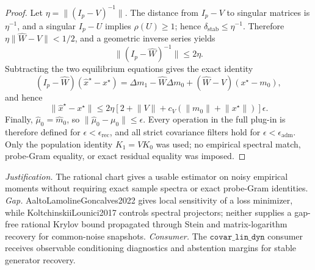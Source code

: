 \documentclass{article}
\begin{document}
\begin{proof}
Let \(\eta=\lVert(I_p-V)^{-1}\rVert\).  The distance from \(I_p-V\) to singular matrices is \(\eta^{-1}\), and a singular \(I_p-U\) implies \(\rho(U)\geq1\); hence \(\delta_{\mathrm{stab}}\leq\eta^{-1}\).  Therefore \(\eta\lVert\widehat W-V\rVert<1/2\), and a geometric inverse series yields
\[
 \lVert(I_p-\widehat W)^{-1}\rVert\leq2\eta.
\]
Subtracting the two equilibrium equations gives the exact identity
\[
 (I_p-\widehat W)(\widehat x^\star-x^\star)
 =\Delta m_1-\widehat W\Delta m_0+(\widehat W-V)(x^\star-m_0),
\]
and hence
\[
 \lVert\widehat x^\star-x^\star\rVert
 \leq2\eta[2+\lVert V\rVert+c_V(\lVert m_0\rVert+\lVert x^\star\rVert)]\epsilon.
\]
Finally, \(\widehat\mu_0=\widehat m_0\), so \(\lVert\widehat\mu_0-\mu_0\rVert\leq\epsilon\).  Every operation in the full plug-in is therefore defined for \(\epsilon<\epsilon_{\mathrm{rec}}\), and all strict covariance filters hold for \(\epsilon<\epsilon_{\mathrm{adm}}\).  Only the population identity \(K_1=VK_0\) was used; no empirical spectral match, probe-Gram equality, or exact residual equality was imposed.
\end{proof}
\par\smallskip\noindent \textit{Justification.} The rational chart gives a usable estimator on noisy empirical moments without requiring exact sample spectra or exact probe-Gram identities. \textit{Gap.} AaltoLamolineGoncalves2022 gives local sensitivity of a loss minimizer, while KoltchinskiiLounici2017 controls spectral projectors; neither supplies a gap-free rational Krylov bound propagated through Stein and matrix-logarithm recovery for common-noise snapshots. \textit{Consumer.} The \(\texttt{covar\_lin\_dyn}\) consumer receives observable conditioning diagnostics and abstention margins for stable generator recovery.
\end{document}
